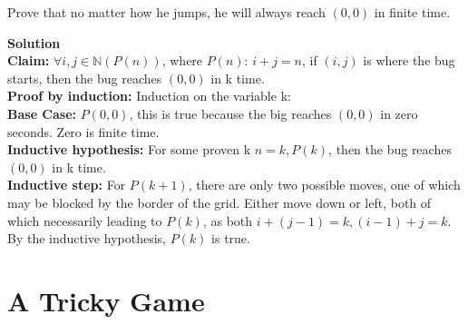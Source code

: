 \documentclass[11pt]{article}
\newcommand*{\Question}[1]{\vfill\pagebreak[3]\section{#1}}
\begin{document}
Prove that no matter how he jumps, he will always reach $(0, 0)$ in finite time.

\begin{mdframed} \textbf{Solution} \\
\textbf{Claim:} $\forall i,j \in \mathbb{N} (P(n))$, where $P(n)$: $i+j=n$, if $(i,j)$ is where the bug starts, then the bug reaches $(0,0)$ in k time. \\
\textbf{Proof by induction:} Induction on the variable k: \\
\textbf{Base Case:} $P(0,0)$, this is true because the big reaches $(0,0)$ in zero seconds. Zero is finite time.\\
\textbf{Inductive hypothesis:} For some proven k $n=k, P(k)$, then the bug reaches $(0,0)$ in k time. \\ 
\textbf{Inductive step:} For $P(k+1)$, there are only two possible moves, one of which may be blocked by the border of the grid. Either move down or left, both of which necessarily leading to $P(k)$, as both $i + (j-1) = k, (i-1) + j = k$. By the inductive hypothesis, $P(k)$ is true. 
\end{mdframed}

\Question{A Tricky Game}
\end{document}
